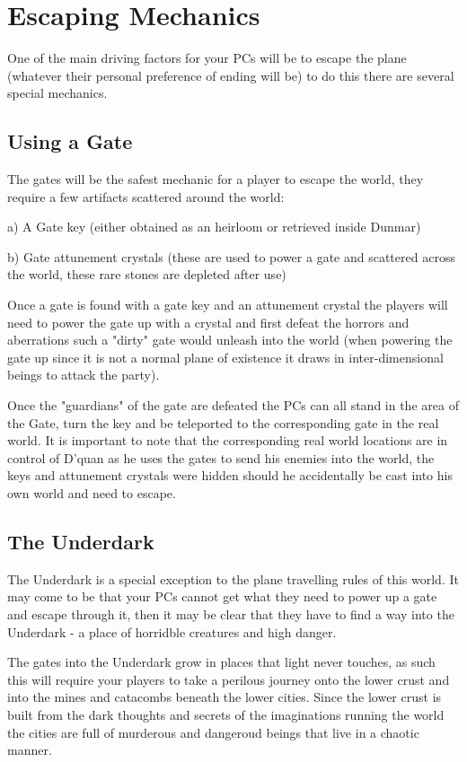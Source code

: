 \documentclass[10pt,twoside,twocolumn]{article}
\begin{document}
\section{Escaping Mechanics}
One of the main driving factors for your PCs will be to escape the plane (whatever their personal preference of ending will be) to do this there are several special mechanics.

\subsection{Using a Gate}
The gates will be the safest mechanic for a player to escape the world, they require a few artifacts scattered around the world:

a) A Gate key (either obtained as an heirloom or retrieved inside Dunmar)

b) Gate attunement crystals (these are used to power a gate and scattered across the world, these rare stones are depleted after use)

Once a gate is found with a gate key and an attunement crystal the players will need to power the gate up with a crystal and first defeat the horrors and aberrations such a "dirty" gate would unleash into the world (when powering the gate up since it is not a normal plane of existence it draws in inter-dimensional beings to attack the party).

Once the "guardians" of the gate are defeated the PCs can all stand in the area of the Gate, turn the key and be teleported to the corresponding gate in the real world. It is important to note that the corresponding real world locations are in control of D'quan as he uses the gates to send his enemies into the world, the keys and attunement crystals were hidden should he accidentally be cast into his own world and need to escape.

\subsection{The Underdark}
The Underdark is a special exception to the plane travelling rules of this world. It may come to be that your PCs cannot get what they need to power up a gate and escape through it, then it may be clear that they have to find a way into the Underdark - a place of horridble creatures and high danger.

The gates into the Underdark grow in places that light never touches, as such this will require your players to take a perilous journey onto the lower crust and into the mines and catacombs beneath the lower cities. Since the lower crust is built from the dark thoughts and secrets of the imaginations running the world the cities are full of murderous and dangeroud beings that live in a chaotic manner.
\end{document}
